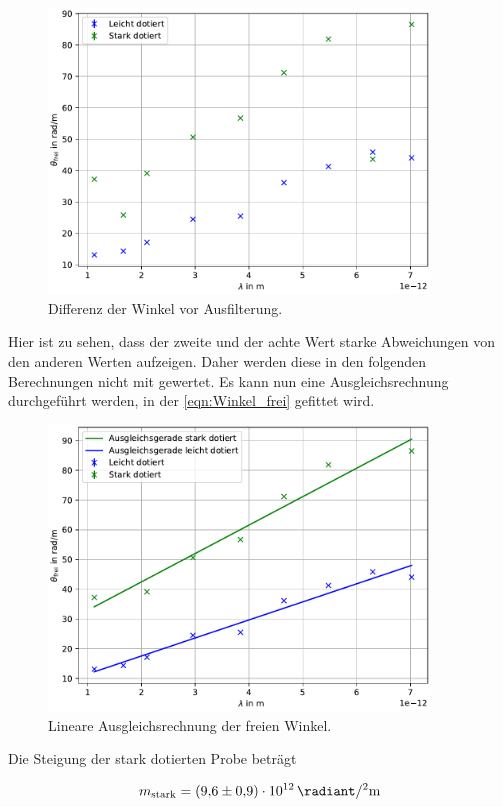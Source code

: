 \begin{figure}[H]
    \centering
    \includegraphics[width=0.9\textwidth]{../Rohplot.pdf}
    \caption{Differenz der Winkel vor Ausfilterung.}
    \label{fig:pre}
\end{figure}

\noindent Hier ist zu sehen, dass der zweite und der achte Wert starke Abweichungen von den anderen Werten 
aufzeigen. Daher werden diese in den folgenden Berechnungen nicht mit gewertet. Es kann nun eine Ausgleichsrechnung 
durchgeführt werden, in der \autoref{eqn:Winkel_frei} gefittet wird. 

\begin{figure}[H]
    \centering
    \includegraphics[width=0.9\textwidth]{../LinRegress.pdf}
    \caption{Lineare Ausgleichsrechnung der freien Winkel.}
    \label{fig:LinRegress}
\end{figure}

\noindent Die Steigung der stark dotierten Probe beträgt 

\begin{equation}
    m_\text{stark}=\qty{9.6\pm0.9e12}{\radiant \per \squared \meter}
\end{equation}



